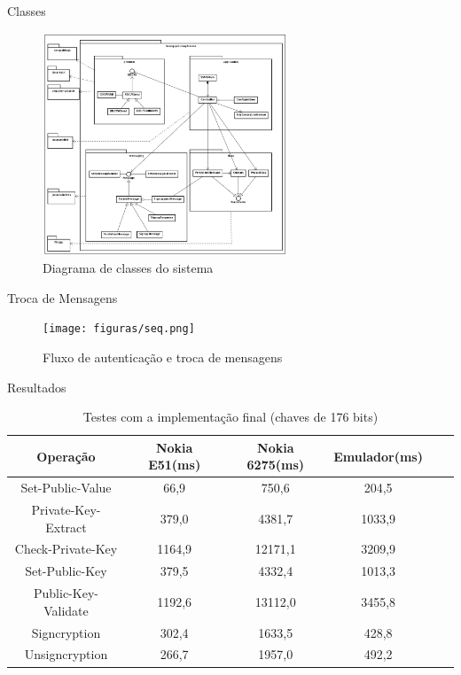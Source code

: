 \documentclass[notes,blue,mathserif]{beamer}
\begin{document}
\begin{frame}{Classes}


\begin{figure}
	\includegraphics[width=0.65\textwidth]{figuras/class_diagram.PNG}
	\caption{Diagrama de classes do sistema}
\end{figure}

\end{frame}

\begin{frame}{Troca de Mensagens}
\begin{figure}
	\texttt{[image: figuras/seq.png]}
	\caption{Fluxo de autentica\c{c}\~{a}o e troca de mensagens}
\end{figure}
\end{frame}

\begin{frame}{Resultados}

\begin{table}[h]\centering
\caption{Testes com a implementa\c{c}\~{a}o final (chaves de 176 bits)} \label{tab:bdcps176final}
\begin{tabular}{cccccc}\hline
Opera\c{c}\~{a}o                   & Nokia E51(ms)   &  Nokia 6275(ms) & Emulador(ms)\\\hline
Set-Public-Value	&	66,9	& 750,6  & 204,5	 \\\hline
Private-Key-Extract &	379,0 &	4381,7 &	1033,9 \\\hline
Check-Private-Key	& 1164,9	& 12171,1  & 3209,9	 \\\hline
Set-Public-Key	& 379,5 &	4332,4 &	1013,3 \\\hline
Public-Key-Validate	&	1192,6 &	13112,0 & 3455,8 \\\hline
Signcryption	&302,4 &	1633,5 & 	428,8 \\\hline
Unsigncryption	&	266,7 &	1957,0 & 492,2 \\\hline
\end{tabular}
\end{table}
\end{frame}
\end{document}
